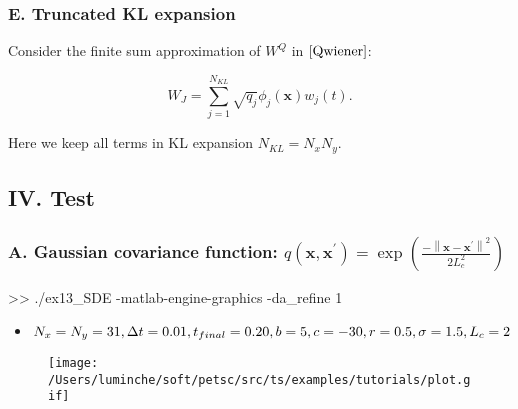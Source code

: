 \documentclass[
]{article}
\newenvironment{Shaded}{}{}
\newcommand{\FloatTok}[1]{\textcolor[rgb]{0.25,0.63,0.44}{#1}}
\newcommand{\NormalTok}[1]{#1}
\begin{document}
\hypertarget{header-n225}{%
\subsubsection{E. Truncated KL expansion}\label{header-n225}}

Consider the finite sum approximation of \(W^Q\) in \(\eqref{Qwiener}\):

\[W_J=\sum^{N_{KL}}_{j=1}\sqrt{q_j}\phi_j(\mathbf{x})w_{j}(t).\]

Here we keep all terms in KL expansion \(N_{KL}=N_xN_y\).

\hypertarget{header-n131}{%
\subsection{IV. Test}\label{header-n131}}

\hypertarget{header-n316}{%
\subsubsection{\texorpdfstring{A. Gaussian covariance function:
\(q(\mathbf{x},\mathbf{x}^{\prime})=\exp \left(\frac{-\left\|\mathbf{x}-\mathbf{x}^{\prime}\right\|^{2}}{2 L_{c}^{2}}\right)\)}{A. Gaussian covariance function: q(\textbackslash mathbf\{x\},\textbackslash mathbf\{x\}\^{}\{\textbackslash prime\})=\textbackslash exp \textbackslash left(\textbackslash frac\{-\textbackslash left\textbackslash\textbar\textbackslash mathbf\{x\}-\textbackslash mathbf\{x\}\^{}\{\textbackslash prime\}\textbackslash right\textbackslash\textbar\^{}\{2\}\}\{2 L\_\{c\}\^{}\{2\}\}\textbackslash right)}}\label{header-n316}}

\begin{Shaded}
\begin{Highlighting}[]
\NormalTok{>> ./ex13_SDE -matlab-engine-graphics -da_refine }\FloatTok{1}
\end{Highlighting}
\end{Shaded}

\begin{itemize}
\item
  \(N_x=N_y=31, \Delta t=0.01, t_{final}=0.20,\\b=5,c=-30,r=0.5,\\\sigma=1.5,L_{c}=2\)
\end{itemize}

\begin{figure}
\centering
\texttt{[image: /Users/luminche/soft/petsc/src/ts/examples/tutorials/plot.gif]}
\caption{}
\end{figure}
\end{document}
